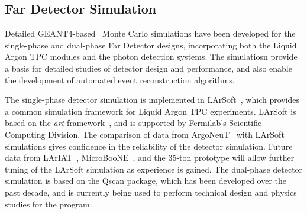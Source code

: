 
\subsection{Far Detector Simulation}
\label{sec:detectors-sc-physics-software-simulation-fd}

Detailed GEANT4-based~\cite{GEANT4:NIM,GEANT4} Monte Carlo simulations have been 
developed for the single-phase and dual-phase Far Detector designs,
incorporating both the Liquid Argon TPC modules
and the photon detection systems. The simulatiosn provide
a basis for detailed studies of detector design and performance, 
and also enable the development of automated event reconstruction algorithms.

The single-phase detector simulation is implemented in LArSoft~\cite{Church:2013hea},
which provides a common simulation framework for Liquid Argon TPC experiments.
LArSoft is based on the {\it art} framework~\cite{Green:2012gv}, and is supported by Fermilab's
Scientific Computing Division.
The comparison of data from ArgoNeuT~\cite{Anderson:2012vc} with LArSoft
simulations gives confidence in the reliability of the detector simulation.
Future data from LArIAT~\cite{Adamson:2013/02/28tla,Cavanna:2014iqa},
MicroBooNE~\cite{Chen:2007ae,Jones:2011ci,microboonecdr}, and the 35-ton prototype will allow
further tuning of the LArSoft simulation as experience is gained.
The dual-phase detector simulation is based on the Qscan package,
which has been developed over the past decade, and is currently
being used to perform technical design and physics studies for
the \cerndualproto{} program.

